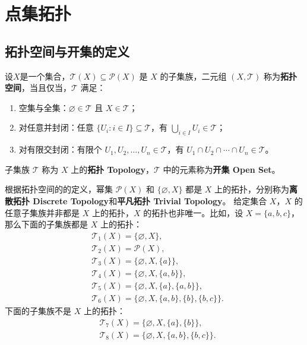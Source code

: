 \chapter{点集拓扑}

\section{拓扑空间与开集的定义}

\begin{definition}
    设$ X $是一个集合，$ \mathcal{T}(X) \subseteq \mathcal{P}(X) $ 是 $ X $ 的子集族，二元组 $ (X,\mathcal{T}) $ 称为\textbf{拓扑空间}，当且仅当，$ \mathcal{T} $ 满足：
    \begin{enumerate}
        \item 空集与全集：$ \varnothing \in \mathcal{T} $ 且 $ X \in \mathcal{T} $；
        \item 对任意并封闭：任意 $ \{U_i:i\in I\} \subseteq \mathcal{T} $，有 $ \bigcup_{i\in I} U_i \in \mathcal{T} $；
        \item 对有限交封闭：有限个 $ U_1,U_2,\ldots,U_n\in \mathcal{T} $，有 $ U_1\cap U_2\cap \cdots \cap U_n \in \mathcal{T} $。
    \end{enumerate}
    子集族 $ \mathcal{T} $ 称为 $ X $ 上的\textbf{拓扑 Topology}，$ \mathcal{T} $ 中的元素称为\textbf{开集 Open Set}。
\end{definition}

\begin{note}
    根据拓扑空间的的定义，幂集 $ \mathcal{P}(X) $ 和 $ \{\varnothing,X\} $ 都是 $ X $ 上的拓扑，分别称为\textbf{离散拓扑 Discrete Topology}和\textbf{平凡拓扑 Trivial Topology}。
    给定集合 $X$，$X$ 的任意子集族并非都是 $X$ 上的拓扑，$X$ 的拓扑也非唯一。比如，设 $ X=\{a,b,c\} $，那么下面的子集族都是 $ X $ 上的拓扑：
    \begin{align*}
        &\mathcal{T}_1(X)=\{\varnothing,X\},\\
        &\mathcal{T}_2(X)=\mathcal{P}(X),\\
        &\mathcal{T}_3(X)=\{\varnothing,X,\{a\}\},\\
        &\mathcal{T}_4(X)=\{\varnothing,X,\{a,b\}\},\\
        &\mathcal{T}_5(X)=\{\varnothing,X,\{a\},\{a,b\}\},\\
        &\mathcal{T}_6(X)=\{\varnothing,X,\{a,b\},\{b\},\{b,c\}\}.
    \end{align*}
    下面的子集族不是 $ X $ 上的拓扑：
    \begin{align*}
        &\mathcal{T}_7(X)=\{\varnothing,X,\{a\},\{b\}\},\\
        &\mathcal{T}_8(X)=\{\varnothing,X,\{a,b\},\{b,c\}\}.
    \end{align*}
\end{note}

\newpage
